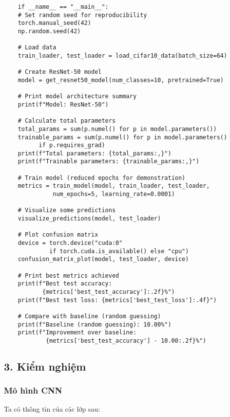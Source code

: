 \documentclass[../main.tex]{subfiles}
\begin{document}
\begin{verbatim}
    if __name__ == "__main__":
    # Set random seed for reproducibility
    torch.manual_seed(42)
    np.random.seed(42)
    
    # Load data
    train_loader, test_loader = load_cifar10_data(batch_size=64)
    
    # Create ResNet-50 model
    model = get_resnet50_model(num_classes=10, pretrained=True)
    
    # Print model architecture summary
    print(f"Model: ResNet-50")
    
    # Calculate total parameters
    total_params = sum(p.numel() for p in model.parameters())
    trainable_params = sum(p.numel() for p in model.parameters() 
          if p.requires_grad)
    print(f"Total parameters: {total_params:,}")
    print(f"Trainable parameters: {trainable_params:,}")
    
    # Train model (reduced epochs for demonstration)
    metrics = train_model(model, train_loader, test_loader, 
              num_epochs=5, learning_rate=0.0001)
    
    # Visualize some predictions
    visualize_predictions(model, test_loader)
    
    # Plot confusion matrix
    device = torch.device("cuda:0" 
             if torch.cuda.is_available() else "cpu")
    confusion_matrix_plot(model, test_loader, device)

    # Print best metrics achieved
    print(f"Best test accuracy: 
           {metrics['best_test_accuracy']:.2f}%")
    print(f"Best test loss: {metrics['best_test_loss']:.4f}")
    
    # Compare with baseline (random guessing)
    print(f"Baseline (random guessing): 10.00%")
    print(f"Improvement over baseline: 
            {metrics['best_test_accuracy'] - 10.00:.2f}%")
\end{verbatim}

\subsection*{3. Kiểm nghiệm}

\subsubsection*{Mô hình CNN}

Ta có thông tin của các lớp sau:
\end{document}
